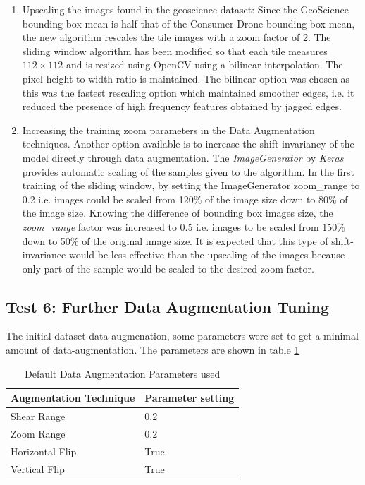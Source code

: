 \documentclass{IEEEtran}
\begin{document}
\begin{enumerate}
\item Upscaling the images found in the geoscience dataset: Since the GeoScience bounding box mean is half that of the Consumer Drone bounding box mean, the new algorithm rescales the tile images with a zoom factor of 2. The sliding window algorithm has been modified so that each tile measures $112 \times 112$ and is resized using OpenCV using a bilinear interpolation. The pixel height to width ratio is maintained. The bilinear option was chosen as this was the fastest rescaling option which maintained smoother edges, i.e. it reduced the presence of high frequency features obtained by jagged edges. \newline

\item Increasing the training zoom parameters in the Data Augmentation techniques. Another option available is to increase the shift invariancy of the model directly through data augmentation. The \textit{ImageGenerator} by \textit{Keras} provides automatic scaling of the samples given to the algorithm. In the first training of the sliding window, by setting the ImageGenerator zoom\_range to 0.2 i.e. images could be scaled from 120\% of the image size down to 80\% of the image size. Knowing the difference of bounding box images size, the \textit{zoom\_range} factor was increased to 0.5 i.e. images to be scaled from 150\% down to 50\% of the original image size. It is expected that this type of shift-invariance would be less effective than the upscaling of the images because only part of the sample would be scaled to the desired zoom factor. \newline
\end{enumerate}

\subsection{Test 6: Further Data Augmentation Tuning}

The initial dataset data augmenation, some parameters were set to get a minimal amount of data-augmentation. The parameters are shown in table \ref{table:dataaugorig}

\begin{table}[ht]
\centering
\caption{Default Data Augmentation Parameters used}
\label{table:dataaugorig}
\begin{tabular}{ll} 
\hline
\textbf{Augmentation Technique}        & \textbf{Parameter setting} \\ 
\hline
Shear Range & 0.2 \\
Zoom Range & 0.2\\
Horizontal Flip & True \\
Vertical Flip & True \\
\end{tabular}
\end{table}
\end{document}

